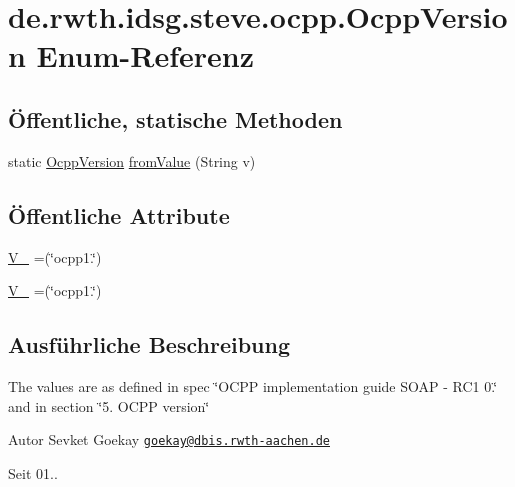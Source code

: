 \hypertarget{enumde_1_1rwth_1_1idsg_1_1steve_1_1ocpp_1_1_ocpp_version}{\section{de.\+rwth.\+idsg.\+steve.\+ocpp.\+Ocpp\+Version Enum-\/\+Referenz}
\label{enumde_1_1rwth_1_1idsg_1_1steve_1_1ocpp_1_1_ocpp_version}
}
\subsection*{Öffentliche, statische Methoden}
\begin{DoxyCompactItemize}
\item 
static \hyperlink{enumde_1_1rwth_1_1idsg_1_1steve_1_1ocpp_1_1_ocpp_version}{Ocpp\+Version} \hyperlink{enumde_1_1rwth_1_1idsg_1_1steve_1_1ocpp_1_1_ocpp_version_aed69dc5ad96e8a2c013a2f84b99883de}{from\+Value} (String v)
\end{DoxyCompactItemize}
\subsection*{Öffentliche Attribute}
\begin{DoxyCompactItemize}
\item 
\hyperlink{enumde_1_1rwth_1_1idsg_1_1steve_1_1ocpp_1_1_ocpp_version_a02a262b834136db4a30bb9a821c77574}{V\+\_} =(\char`\"{}ocpp1.\char`\"{})
\item 
\hyperlink{enumde_1_1rwth_1_1idsg_1_1steve_1_1ocpp_1_1_ocpp_version_a73e998996dec6fa643fc3241249866d4}{V\+\_} =(\char`\"{}ocpp1.\char`\"{})
\end{DoxyCompactItemize}


\subsection{Ausführliche Beschreibung}
The values are as defined in spec \char`\"{}\+O\+C\+P\+P implementation guide S\+O\+A\+P -\/ R\+C1 0.\char`\"{} and in section \char`\"{}5. O\+C\+P\+P version\char`\"{}

\begin{DoxyAuthor}{Autor}
Sevket Goekay \href{mailto:goekay@dbis.rwth-aachen.de}{\tt goekay@dbis.\+rwth-\/aachen.\+de} 
\end{DoxyAuthor}
\begin{DoxySince}{Seit}
01.. 
\end{DoxySince}


